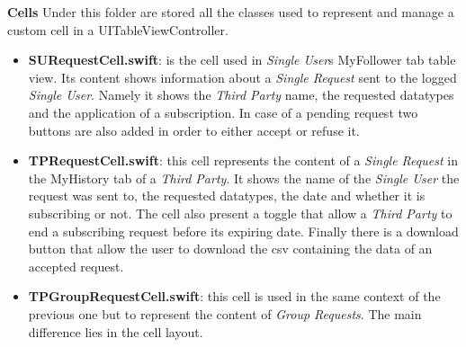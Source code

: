\documentclass[titlepage]{article}
\begin{document}
	\newline
	\noindent
	{\bf Cells} \newline
	Under this folder are stored all the classes used to represent and manage a custom cell in a UITableViewController.
	\begin{itemize}
		\item {\bf SURequestCell.swift}: is the cell used in {\it {\it Single User}}\textsc{}s MyFollower tab table view. Its content shows information about a {\it Single Request} sent to the logged {\it {\it Single User}}. Namely it shows the {\it {\it Third Party}} name, the requested datatypes and the application of a subscription. In case of a pending request two buttons are also added in order to either accept or refuse it.
		\item {\bf TPRequestCell.swift}: this cell represents the content of a {\it Single Request} in the MyHistory tab of a {\it {\it Third Party}}. It shows the name of the {\it {\it Single User}} the request was sent to, the requested datatypes, the date and whether it is subscribing or not. The cell also present a toggle that allow a {\it {\it Third Party}} to end a subscribing request before its expiring date. Finally there is a download button that allow the user to download the csv containing the data of an accepted request.
		\item {\bf TPGroupRequestCell.swift}: this cell is used in the same context of the previous one but to represent the content of {\it Group Requests}. The main difference lies in the cell layout.
	\end{itemize}
	
\end{document}
